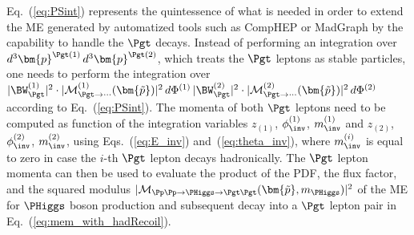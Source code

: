 Eq.~(\ref{eq:PSint}) represents the quintessence of what is needed 
in order to extend the ME generated by automatized tools such as
CompHEP or MadGraph
by the capability to handle the $\Pgt$ decays.
Instead of performing an integration over $d^{3}\bm{p}^{\Pgt(1)} \,
d^{3}\bm{p}^{\Pgt(2)}$, which treats the $\Pgt$ leptons as stable particles,
one needs to perform the integration over $\vert \BW^{(1)}_{\Pgt} \vert^{2} \cdot \vert
\mathcal{M}^{(1)}_{\Pgt\to\cdots}(\bm{\tilde{p}}) \vert^{2} \, d\Phi^{(1)} \, \vert \BW^{(2)}_{\Pgt} \vert^{2} \cdot \vert
\mathcal{M}^{(2)}_{\Pgt\to\cdots}(\bm{\tilde{p}}) \vert^{2} \, d\Phi^{(2)}$ according to
Eq.~(\ref{eq:PSint}).
The momenta of both $\Pgt$ leptons need to be computed as
function of the integration variables $z_{(1)}$, $\phi_{\inv}^{(1)}$,
$m_{\inv}^{(1)}$ and $z_{(2)}$, $\phi_{\inv}^{(2)}$,
$m_{\inv}^{(2)}$, using Eqs.~(\ref{eq:E_inv})
and~(\ref{eq:theta_inv}),
where $m_{\inv}^{(i)}$ is equal to zero in case the $i$-th $\Pgt$ lepton
decays hadronically.
The $\Pgt$ lepton momenta can then be used to evaluate the product of the PDF, the flux factor, 
and the squared modulus $\vert \mathcal{M}_{\Pp\Pp \to \PHiggs \to \Pgt\Pgt}(\bm{\tilde{p}},m_{\PHiggs}) \vert^{2}$ 
of the ME for $\PHiggs$ boson production and subsequent decay into a $\Pgt$ lepton pair in Eq.~(\ref{eq:mem_with_hadRecoil}).
 
